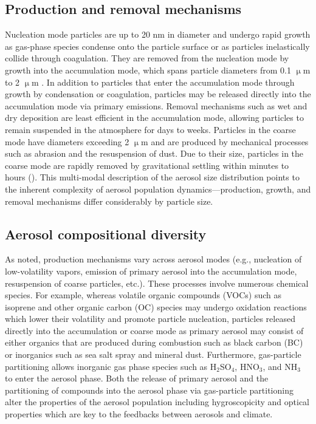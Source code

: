 \subsection{Production and removal mechanisms}
Nucleation mode particles are up to 20 nm in diameter and undergo rapid growth as gas-phase species condense onto the particle surface or as particles inelastically collide through coagulation. They are removed from the nucleation mode by growth into the accumulation mode, which spans particle diameters from 0.1 $\upmu$m to 2 $\upmu$m . In addition to particles that enter the accumulation mode through growth by condensation or coagulation, particles may be released directly into the accumulation mode via primary emissions. Removal mechanisms such as wet and dry deposition are least efficient in the accumulation mode, allowing particles to remain suspended in the atmosphere for days to weeks. Particles in the coarse mode have diameters exceeding 2 $\upmu$m  and are produced by mechanical processes such as abrasion and the resuspension of dust. Due to their size, particles in the coarse mode are rapidly removed by gravitational settling within minutes to hours (\cite{seinfeld_atmospheric_1998}). This multi-modal description of the aerosol size distribution points to the inherent complexity of aerosol population dynamics---production, growth, and removal mechanisms differ considerably by particle size. 

\subsection{Aerosol compositional diversity}
As noted, production mechanisms vary across aerosol modes (e.g., nucleation of low-volatility vapors, emission of primary aerosol into the accumulation mode, resuspension of coarse particles, etc.). These processes involve numerous chemical species. For example, whereas volatile organic compounds (VOCs) such as isoprene and other organic carbon (OC) species may undergo oxidation reactions which lower their volatility and promote particle nucleation, particles released directly into the accumulation or coarse mode as primary aerosol may consist of either organics that are produced during combustion such as black carbon (BC) or inorganics such as sea salt spray and mineral dust. Furthermore, gas-particle partitioning allows inorganic gas phase species such as H$_2$SO$_4$, HNO$_3$, and NH$_3$ to enter the aerosol phase. Both the release of primary aerosol and the partitioning of compounds into the aerosol phase via gas-particle partitioning alter the properties of the aerosol population including hygroscopicity and optical properties which are key to the feedbacks between aerosols and climate.  

